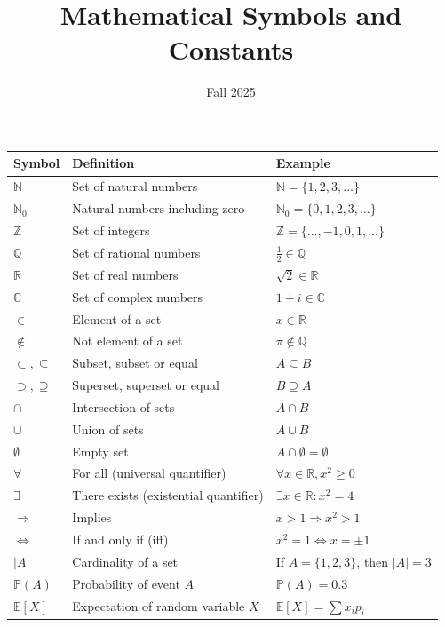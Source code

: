 \documentclass[12pt]{article}
\title{Mathematical Symbols and Constants}
\date{Fall 2025}
\begin{document}
\maketitle

\begin{table}[ht]
\centering
\renewcommand{\arraystretch}{1.3}
\begin{tabular}{lll}
\toprule
\textbf{Symbol} & \textbf{Definition} & \textbf{Example} \\
\midrule
$\mathbb{N}$ & Set of natural numbers & $\mathbb{N} = \{1,2,3,\dots\}$ \\
$\mathbb{N}_0$ & Natural numbers including zero & $\mathbb{N}_0 = \{0,1,2,3,\dots\}$ \\
$\mathbb{Z}$ & Set of integers & $\mathbb{Z} = \{\dots,-1,0,1,\dots\}$ \\
$\mathbb{Q}$ & Set of rational numbers & $\frac{1}{2} \in \mathbb{Q}$ \\
$\mathbb{R}$ & Set of real numbers & $\sqrt{2} \in \mathbb{R}$ \\
$\mathbb{C}$ & Set of complex numbers & $1+i \in \mathbb{C}$ \\
$\in$ & Element of a set & $x \in \mathbb{R}$ \\
$\notin$ & Not element of a set & $\pi \notin \mathbb{Q}$ \\
$\subset, \subseteq$ & Subset, subset or equal & $A \subseteq B$ \\
$\supset, \supseteq$ & Superset, superset or equal & $B \supseteq A$ \\
$\cap$ & Intersection of sets & $A \cap B$ \\
$\cup$ & Union of sets & $A \cup B$ \\
$\emptyset$ & Empty set & $A \cap \emptyset = \emptyset$ \\
$\forall$ & For all (universal quantifier) & $\forall x \in \mathbb{R}, x^2 \ge 0$ \\
$\exists$ & There exists (existential quantifier) & $\exists x \in \mathbb{R}: x^2 = 4$ \\
$\Rightarrow$ & Implies & $x > 1 \Rightarrow x^2 > 1$ \\
$\Leftrightarrow$ & If and only if (iff) & $x^2=1 \Leftrightarrow x=\pm 1$ \\
$|A|$ & Cardinality of a set & If $A=\{1,2,3\}$, then $|A|=3$ \\
$\mathbb{P}(A)$ & Probability of event $A$ & $\mathbb{P}(A)=0.3$ \\
$\mathbb{E}[X]$ & Expectation of random variable $X$ & $\mathbb{E}[X]=\sum x_i p_i$ \\

\end{tabular}
\end{table}
\end{document}
